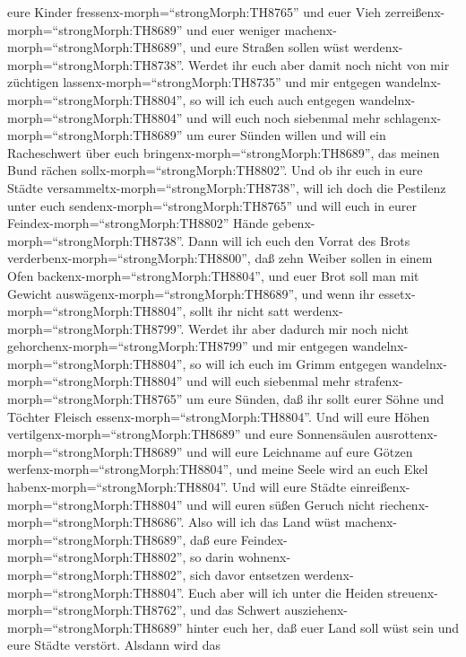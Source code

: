 eure Kinder fressenx-morph=``strongMorph:TH8765'' und euer Vieh
zerreißenx-morph=``strongMorph:TH8689'' und euer weniger
machenx-morph=``strongMorph:TH8689'', und eure Straßen sollen wüst
werdenx-morph=``strongMorph:TH8738''.  Werdet ihr euch aber
damit noch nicht von mir züchtigen lassenx-morph=``strongMorph:TH8735''
und mir entgegen wandelnx-morph=``strongMorph:TH8804'',  so
will ich euch auch entgegen wandelnx-morph=``strongMorph:TH8804'' und
will euch noch siebenmal mehr schlagenx-morph=``strongMorph:TH8689'' um
eurer Sünden willen  und will ein Racheschwert über euch
bringenx-morph=``strongMorph:TH8689'', das meinen Bund rächen
sollx-morph=``strongMorph:TH8802''. Und ob ihr euch in eure Städte
versammeltx-morph=``strongMorph:TH8738'', will ich doch die Pestilenz
unter euch sendenx-morph=``strongMorph:TH8765'' und will euch in eurer
Feindex-morph=``strongMorph:TH8802'' Hände
gebenx-morph=``strongMorph:TH8738''.  Dann will ich euch
den Vorrat des Brots verderbenx-morph=``strongMorph:TH8800'', daß zehn
Weiber sollen in einem Ofen backenx-morph=``strongMorph:TH8804'', und
euer Brot soll man mit Gewicht auswägenx-morph=``strongMorph:TH8689'',
und wenn ihr essetx-morph=``strongMorph:TH8804'', sollt ihr nicht satt
werdenx-morph=``strongMorph:TH8799''.  Werdet ihr aber
dadurch mir noch nicht gehorchenx-morph=``strongMorph:TH8799'' und mir
entgegen wandelnx-morph=``strongMorph:TH8804'',  so will
ich euch im Grimm entgegen wandelnx-morph=``strongMorph:TH8804'' und
will euch siebenmal mehr strafenx-morph=``strongMorph:TH8765'' um eure
Sünden,  daß ihr sollt eurer Söhne und Töchter Fleisch
essenx-morph=``strongMorph:TH8804''.  Und will eure Höhen
vertilgenx-morph=``strongMorph:TH8689'' und eure Sonnensäulen
ausrottenx-morph=``strongMorph:TH8689'' und will eure Leichname auf eure
Götzen werfenx-morph=``strongMorph:TH8804'', und meine Seele wird an
euch Ekel habenx-morph=``strongMorph:TH8804''.  Und will
eure Städte einreißenx-morph=``strongMorph:TH8804'' und will euren süßen
Geruch nicht riechenx-morph=``strongMorph:TH8686''.  Also
will ich das Land wüst machenx-morph=``strongMorph:TH8689'', daß eure
Feindex-morph=``strongMorph:TH8802'', so darin
wohnenx-morph=``strongMorph:TH8802'', sich davor entsetzen
werdenx-morph=``strongMorph:TH8804''.  Euch aber will ich
unter die Heiden streuenx-morph=``strongMorph:TH8762'', und das Schwert
ausziehenx-morph=``strongMorph:TH8689'' hinter euch her, daß euer Land
soll wüst sein und eure Städte verstört.  Alsdann wird das

